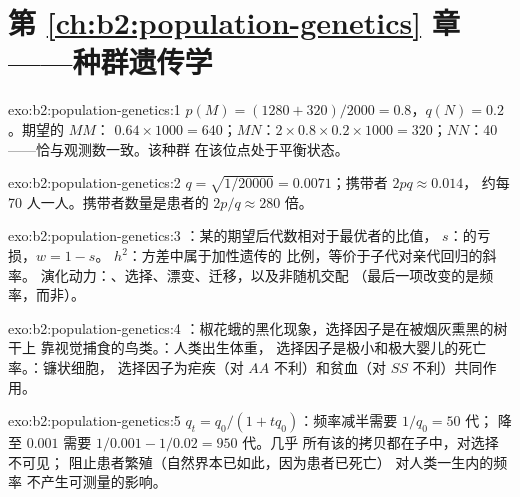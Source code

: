 \section*{第 \ref{ch:b2:population-genetics} 章——种群遗传学}

\begin{solution}{exo:b2:population-genetics:1}
$p(M) = (1280 + 320)/2000 = 0.8$，$q(N) = 0.2$。期望的 $MM$：
$0.64\times 1000 = 640$；$MN$：$2\times 0.8\times 0.2\times 1000 =
320$；$NN$：40——恰与观测数一致。该种群
在该位点处于平衡状态。
\end{solution}

\begin{solution}{exo:b2:population-genetics:2}
$q = \sqrt{1/20000} = 0.0071$；携带者 $2pq \approx 0.014$，
约每 70 人一人。携带者数量是患者的 $2p/q \approx
280$ 倍。
\end{solution}

\begin{solution}{exo:b2:population-genetics:3}
：某的期望后代数相对于最优者的比值，
 $s$：的亏损，$w = 1 -
s$。 $h^{2}$：方差中属于加性遗传的
比例，等价于子代对亲代回归的斜率。
演化动力：、选择、漂变、迁移，以及非随机交配
（最后一项改变的是频率，而非）。
\end{solution}

\begin{solution}{exo:b2:population-genetics:4}
：椒花蛾的黑化现象，选择因子是在被烟灰熏黑的树干上
靠视觉捕食的鸟类。：人类出生体重，
选择因子是极小和极大婴儿的死亡率。：镰状细胞，
选择因子为疟疾（对 $AA$ 不利）和贫血（对
$SS$ 不利）共同作用。
\end{solution}

\begin{solution}{exo:b2:population-genetics:5}
$q_t = q_0/(1 + tq_0)$：频率减半需要 $1/q_0 = 50$ 代；
降至 $0.001$ 需要 $1/0.001 - 1/0.02 = 950$ 代。几乎
所有该的拷贝都在子中，对选择不可见；
阻止患者繁殖（自然界本已如此，因为患者已死亡）
对人类一生内的频率
不产生可测量的影响。
\end{solution}

